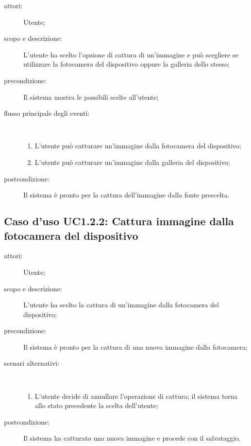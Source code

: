 \begin{description}
\item[attori:] Utente;
\item[scopo e descrizione:] L'utente ha scelto l'opzione di cattura di un'immagine e può scegliere se utilizzare la fotocamera del dispositivo oppure la galleria dello stesso;
\item[precondizione:] Il sistema mostra le possibili scelte all'utente;
\item[flusso principale degli eventi:] \hfill \\
	\begin{enumerate}
	\item L'utente può catturare un'immagine dalla fotocamera del dispositivo;
	\item L'utente può catturare un'immagine dalla galleria del dispositivo;
	\end{enumerate}
\item[postcondizione:] Il sistema è pronto per la cattura dell'immagine dalla fonte prescelta.
\end{description}

\subsection{Caso d'uso UC1.2.2: Cattura immagine dalla fotocamera del dispositivo}
\begin{description}
\item[attori:] Utente;
\item[scopo e descrizione:] L'utente ha scelto la cattura di un'immagine dalla fotocamera del dispositivo;
\item[precondizione:] Il sistema è pronto per la cattura di una nuova immagine dalla fotocamera;
\item[scenari alternativi:] \hfill \\
	\begin{enumerate}
	\item L'utente decide di annullare l'operazione di cattura; il sistema torna allo stato precedente la scelta dell'utente;
	\end{enumerate}
\item[postcondizione:] Il sistema ha catturato una nuova immagine e procede con il salvataggio.
\end{description}

